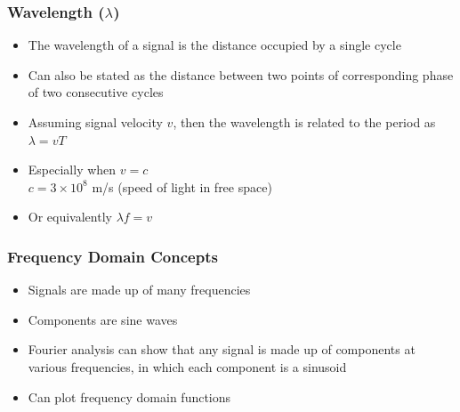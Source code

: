 \documentclass[pdflatex,compress]{beamer}
\begin{document}
\begin{frame}
	\frametitle{Wavelength ($ \lambda $)}
	\begin{itemize}
		\item The wavelength of a signal is the distance occupied by a single cycle
		\item Can also be stated as the distance between two points of corresponding phase of two consecutive cycles
		\item Assuming signal velocity $ v $, then the wavelength is related to the period as $ \lambda = vT $
		\item Especially when $ v=c $\\
		$ c = 3\times10^8 $ m/s (speed of light in free space)
		\item Or equivalently $ \lambda f = v $
	\end{itemize}
\end{frame}

\begin{frame}
	\frametitle{Frequency Domain Concepts}
	\begin{itemize}
		\item Signals are made up of many frequencies
		\item Components are sine waves
		\item Fourier analysis can show that any signal is made up of components at various frequencies, in which each component is a sinusoid
		\item Can plot frequency domain functions
	\end{itemize}
\end{frame}
\end{document}
